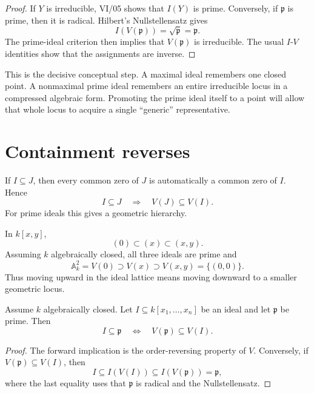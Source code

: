 \begin{proof}
If \(Y\) is irreducible, VI/05 shows that \(I(Y)\) is prime.  Conversely, if
\(\mathfrak p\) is prime, then it is radical.  Hilbert's Nullstellensatz gives
\[
I(V(\mathfrak p))=\sqrt{\mathfrak p}=\mathfrak p.
\]
The prime-ideal criterion then implies that \(V(\mathfrak p)\) is irreducible.  The
usual \(I\)-\(V\) identities show that the assignments are inverse.
\end{proof}

This is the decisive conceptual step.  A maximal ideal remembers one closed point.  A
nonmaximal prime ideal remembers an entire irreducible locus in a compressed algebraic form.
Promoting the prime ideal itself to a point will allow that whole locus to acquire a single
``generic'' representative.

\section{Containment reverses}

If \(I\subseteq J\), then every common zero of \(J\) is automatically a common zero of
\(I\).  Hence
\[
I\subseteq J
\quad\Longrightarrow\quad
V(J)\subseteq V(I).
\]
For prime ideals this gives a geometric hierarchy.

\begin{example}
In \(k[x,y]\),
\[
(0)\subset (x)\subset (x,y).
\]
Assuming \(k\) algebraically closed, all three ideals are prime and
\[
\mathbb A_k^2=V(0)\supset V(x)\supset V(x,y)=\{(0,0)\}.
\]
Thus moving upward in the ideal lattice means moving downward to a smaller geometric
locus.
\end{example}



\begin{proposition}
\label{prop:vi06-incidence}
Assume \(k\) algebraically closed.  Let \(I\subseteq k[x_1,\dots,x_n]\) be an ideal and
let \(\mathfrak p\) be prime.  Then
\[
I\subseteq\mathfrak p
\quad\Longleftrightarrow\quad
V(\mathfrak p)\subseteq V(I).
\]
\end{proposition}

\begin{proof}
The forward implication is the order-reversing property of \(V\).  Conversely, if
\(V(\mathfrak p)\subseteq V(I)\), then
\[
I\subseteq I(V(I))\subseteq I(V(\mathfrak p))=\mathfrak p,
\]
where the last equality uses that \(\mathfrak p\) is radical and the Nullstellensatz.
\end{proof}

